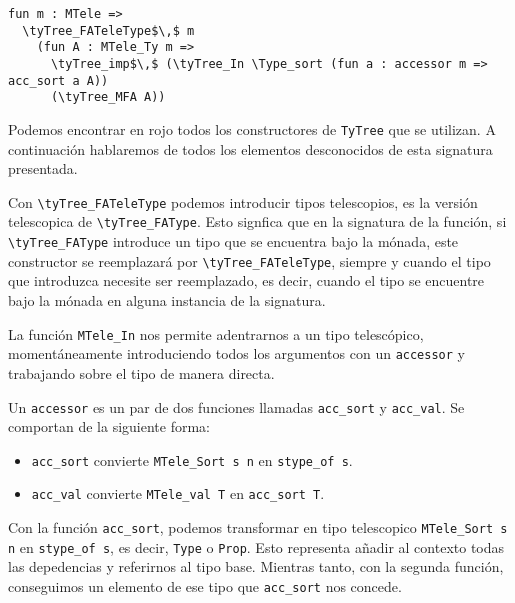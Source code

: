 \begin{lstlisting}[frame=tb,caption={\lstinline{ret} lifteado},label=lst:ret_lift_m]
fun m : MTele =>
  \tyTree_FATeleType$\,$ m
    (fun A : MTele_Ty m =>
      \tyTree_imp$\,$ (\tyTree_In \Type_sort (fun a : accessor m => acc_sort a A))
      (\tyTree_MFA A))
\end{lstlisting}

Podemos encontrar en rojo todos los constructores de \lstinline{TyTree} que se utilizan.
A continuación hablaremos de todos los elementos desconocidos de esta signatura presentada.

Con \lstinline{\tyTree_FATeleType} podemos introducir tipos telescopios, es la versión telescopica de \lstinline{\tyTree_FAType}. Esto signfica que en la signatura de la función, si \lstinline{\tyTree_FAType} introduce un tipo que se encuentra bajo la mónada, este constructor se reemplazará por \lstinline{\tyTree_FATeleType}, siempre y cuando el tipo que introduzca necesite ser reemplazado, es decir, cuando el tipo se encuentre bajo la mónada en alguna instancia de la signatura.

La función \lstinline{MTele_In} nos permite adentrarnos a un tipo telescópico, momentáneamente introduciendo todos los argumentos con un \lstinline{accessor} y trabajando sobre el tipo de manera directa.

Un \lstinline{accessor} es un par de dos funciones llamadas \lstinline{acc_sort} y \lstinline{acc_val}.
Se comportan de la siguiente forma:
\begin{itemize}
  \item \lstinline{acc_sort} convierte \lstinline{MTele_Sort s n} en \lstinline{stype_of s}.
  \item \lstinline{acc_val} convierte \lstinline{MTele_val T} en \lstinline{acc_sort T}.
\end{itemize}

Con la función \lstinline{acc_sort}, podemos transformar en tipo telescopico \lstinline{MTele_Sort s n} en \lstinline{stype_of s}, es decir, \lstinline{Type} o \lstinline{Prop}. Esto representa añadir al contexto todas las depedencias y referirnos al tipo base. Mientras tanto, con la segunda función, conseguimos un elemento de ese tipo que \lstinline{acc_sort} nos concede.

